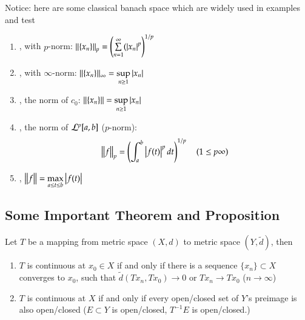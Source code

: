 \begin{definition}\label{def:1.15}
Notice: here are some classical banach space which are widely used in examples and test
\begin{enumerate}[itemsep=0pt, topsep=0pt]
    \item {}, with $p$-norm: $\Norm{\{x_n\}}_p = \left(\sum\limits_{n=1}^{\infty}(\Abs{x_n}^p\right)^{1/p}$
    \item {}, with $\infty$-norm: $\Norm{\{x_n\}}_{\infty} = \sup\limits_{n \geq 1} \Abs{x_n}$
    \item {}, the norm of $c_0$: $\Norm{\{x_n\}} = \sup\limits_{n \geq 1} \Abs{x_n}$
    \item {}, the norm of $\mathcal{L}^p[a, b]$ ($p$-norm): $$\Norm{f}_p = \left(\int_{a}^{b} \Abs{f(t)}^p dt \right)^{1/p} \quad (1 \leq p \infty)$$
    \item {}, $\Norm{f} = \max\limits_{a\leq t \leq b} \Abs{f(t)}$
\end{enumerate}
\end{definition}

\subsection{Some Important Theorem and Proposition}
\begin{theorem}\label{thm:1.16}
Let $T$ be a mapping from metric space $(X, d)$ to metric space $(Y, \tilde{d})$, then
\begin{enumerate}[itemsep=0pt, topsep=0pt]
    \item $T$ is continuous at $x_0 \in X$ if and only if there is a sequence $\{x_n\} \subset X$ converges to $x_0$, such that $\tilde{d}(Tx_n, Tx_0) \to 0$ or $Tx_n \to Tx_0$ ($n \to \infty$)
    \item $T$ is continuous at $X$ if and only if every open/closed set of $Y$'s preimage is also open/closed ($E \subset Y$ is open/closed, $T^{-1}E$ is open/closed.)
\end{enumerate}
\end{theorem}

